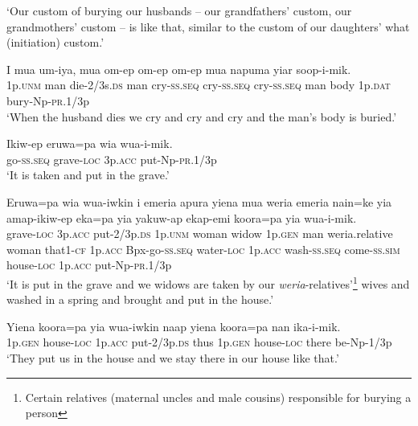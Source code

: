 \glt ‘Our custom of burying our husbands – our grandfathers’ custom, our grandmothers’ custom – is like that, similar to the custom of our daughters’ what (initiation) custom.’ \\
\z


\ea
\gll  I  mua  um-iya,  mua  om-ep  om-ep  om-ep  mua                    napuma  yiar  soop-i-mik. \\
1p.\textsc{unm}  man  die-2/3s.\textsc{ds}  man  cry-\textsc{ss.seq}  cry-\textsc{ss.seq}  cry-\textsc{ss.seq}  man  body  1p.\textsc{dat}  bury-Np-\textsc{pr}.1/3p \\


\glt ‘When the husband dies we cry and cry and cry and the man’s body is buried.’ \\
\z


\ea
\gll  Ikiw-ep  eruwa=pa  wia  wua-i-mik. \\
go-\textsc{ss.seq}  grave-\textsc{loc}  3p.\textsc{acc}  put-Np-\textsc{pr}.1/3p \\
\glt ‘It is taken and put in the grave.’ \\
\z


\ea
\gll  Eruwa=pa  wia  wua-iwkin  i  emeria  apura  yiena      mua  weria  emeria  nain=ke  yia  amap-ikiw-ep  eka=pa                  yia  yakuw-ap  ekap-emi  koora=pa  yia  wua-i-mik. \\
grave-\textsc{loc}  3p.\textsc{acc}  put-2/3p.\textsc{ds}  1p.\textsc{unm}  woman  widow  1p.\textsc{gen} man  weria.relative  woman  that1-\textsc{cf}  1p.\textsc{acc}  Bpx-go-\textsc{ss.seq}  water-\textsc{loc}  1p.\textsc{acc}  wash-\textsc{ss.seq}  come-\textsc{ss}.\textsc{sim}  house-\textsc{loc}  1p.\textsc{acc}  put-Np-\textsc{pr}.1/3p \\




\glt ‘It is put in the grave and we widows are taken by our \textit{weria}{}-relatives’\footnote{ Certain relatives (maternal uncles and male cousins) responsible for burying a person} wives and washed in a spring and brought and put in the house.’ \\
\z


\ea
\gll  Yiena  koora=pa  yia  wua-iwkin  naap  yiena  koora=pa      nan  ika-i-mik. \\
1p.\textsc{gen}  house-\textsc{loc}  1p.\textsc{acc}  put-2/3p.\textsc{ds}  thus  1p.\textsc{gen}  house-\textsc{loc}   there  be-Np-1/3p \\


\glt ‘They put us in the house and we stay there in our house like that.’ \\
\z


